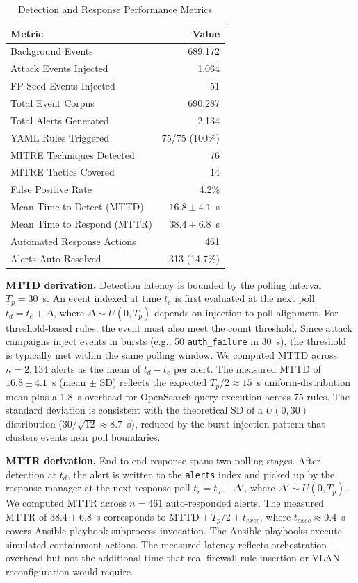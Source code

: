 \documentclass[conference,10pt]{IEEEtran}
\begin{document}
\begin{table}[h]
\centering
\caption{Detection and Response Performance Metrics}
\label{tab:detection-performance}
\begin{tabular}{lr}
\toprule
\textbf{Metric} & \textbf{Value} \\
\midrule
Background Events & 689,172 \\
Attack Events Injected & 1,064 \\
FP Seed Events Injected & 51 \\
Total Event Corpus & 690,287 \\
Total Alerts Generated & 2,134 \\
YAML Rules Triggered & 75/75 (100\%) \\
MITRE Techniques Detected & 76 \\
MITRE Tactics Covered & 14 \\
False Positive Rate & 4.2\% \\
Mean Time to Detect (MTTD) & $16.8 \pm 4.1$~s \\
Mean Time to Respond (MTTR) & $38.4 \pm 6.8$~s \\
Automated Response Actions & 461 \\
Alerts Auto-Resolved & 313 (14.7\%) \\
\bottomrule
\end{tabular}
\end{table}

\textbf{MTTD derivation.} Detection latency is bounded by the polling interval $T_p = 30$~s. An event indexed at time $t_e$ is first evaluated at the next poll $t_d = t_e + \Delta$, where $\Delta \sim U(0, T_p)$ depends on injection-to-poll alignment. For threshold-based rules, the event must also meet the count threshold. Since attack campaigns inject events in bursts (e.g., 50 \texttt{auth\_failure} in 30~s), the threshold is typically met within the same polling window. We computed MTTD across $n = 2{,}134$ alerts as the mean of $t_d - t_e$ per alert. The measured MTTD of $16.8 \pm 4.1$~s (mean $\pm$ SD) reflects the expected $T_p/2 \approx 15$~s uniform-distribution mean plus a 1.8~s overhead for OpenSearch query execution across 75 rules. The standard deviation is consistent with the theoretical SD of a $U(0, 30)$ distribution ($30/\sqrt{12} \approx 8.7$~s), reduced by the burst-injection pattern that clusters events near poll boundaries.

\textbf{MTTR derivation.} End-to-end response spans two polling stages. After detection at $t_d$, the alert is written to the \texttt{alerts} index and picked up by the response manager at the next response poll $t_r = t_d + \Delta'$, where $\Delta' \sim U(0, T_p)$. We computed MTTR across $n = 461$ auto-responded alerts. The measured MTTR of $38.4 \pm 6.8$~s corresponds to $\text{MTTD} + T_p/2 + t_{exec}$, where $t_{exec} \approx 0.4$~s covers Ansible playbook subprocess invocation. The Ansible playbooks execute simulated containment actions. The measured latency reflects orchestration overhead but not the additional time that real firewall rule insertion or VLAN reconfiguration would require.
\end{document}
